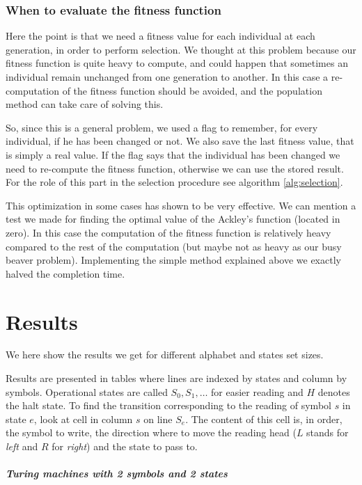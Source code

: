 \documentclass{report}
\begin{document}
\subsection{When to evaluate the fitness function}

Here the point is that we need a fitness value for each individual at each generation, in order to perform selection.
We thought at this problem because our fitness function is quite heavy to compute, and could happen that sometimes an individual remain unchanged from one generation to another. In this case a re-computation of the fitness function should be avoided, and the population method can take care of solving this.

So, since this is a general problem, we used a flag to remember, for every individual, if he has been changed or not. We also save the last fitness value, that is simply a real value. If the flag says that the individual has been changed we need to re-compute the fitness function, otherwise we can use the stored result. For the role of this part in the selection procedure see algorithm \ref{alg:selection}.

This optimization in some cases has shown to be very effective. We can mention a test we made for finding the optimal value of the Ackley's function (located in zero). In this case the computation of the fitness function is relatively heavy compared to the rest of the computation (but maybe not as heavy as our busy beaver problem).
Implementing the simple method explained above we exactly halved the completion time.


\chapter{Results}
\label{chap:results}

We here show the results we get for different alphabet and states set sizes.

Results are presented in tables where lines are indexed by states and column by symbols. Operational states are called $S_0, S_1, \dots$ for easier reading and $H$ denotes the halt state. To find the transition corresponding to the reading of symbol $s$ in state $e$, look at cell in column $s$ on line $S_e$. The content of this cell is, in order, the symbol to write, the direction where to move the reading head ($L$ stands for \emph{left} and $R$ for \emph{right}) and the state to pass to.

\paragraph{Turing machines with 2 symbols and 2 states}
\end{document}
